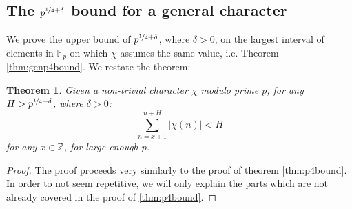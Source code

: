 \documentclass{report}
\newtheorem*{theorem*}{Theorem}
\begin{document}
\subsection{The $p^{\nicefrac{1}{4}+\delta}$ bound for a general character}
We prove the upper bound of $p^{\nicefrac{1}{4}+\delta}$, where $\delta>0$, on the largest interval of elements in $\mathbb{F}_p$ on which $\chi$ assumes the same value, i.e. Theorem \ref{thm:genp4bound}. We restate the theorem:
\begin{theorem*}
Given a non-trivial character $\chi$ modulo prime $p$, for any $H>p^{\nicefrac{1}{4}+\delta}$, where $\delta>0$:
\[\sum\limits_{n=x+1}^{n+H}\lvert\chi(n)\rvert<H\]
for any $x\in\mathbb{Z}$, for large enough $p$.
\end{theorem*}
\begin{proof}
The proof proceeds very similarly to the proof of theorem \ref{thm:p4bound}. In order to not seem repetitive, we will only explain the parts which are not already covered in the proof of \ref{thm:p4bound}.


\end{proof}
\end{document}
